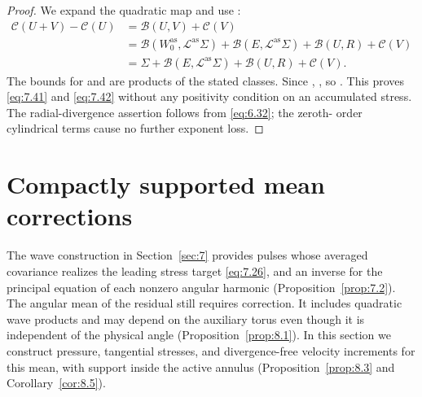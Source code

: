 \begin{proof}
We expand the quadratic map and use
:
\begin{align*}
  \mathcal C(U+V)-\mathcal C(U)
    &=\mathcal B(U,V)+\mathcal C(V)\\
    &=\mathcal B(W_0^{\mathrm{as}},\mathcal L^{\mathrm{as}}\Sigma)
      +\mathcal B(E,\mathcal L^{\mathrm{as}}\Sigma)+\mathcal B(U,R)+\mathcal C(V)\\
    &=\Sigma+\mathcal B(E,\mathcal L^{\mathrm{as}}\Sigma)
      +\mathcal B(U,R)+\mathcal C(V).
\end{align*}
The bounds for  and
 are products of the stated classes. Since
,
, so
. This proves \eqref{eq:7.41} and \eqref{eq:7.42} without any positivity condition
%
on an accumulated stress. The radial-divergence assertion follows from \eqref{eq:6.32}; the zeroth-
order cylindrical terms cause no further exponent loss.
\end{proof}

\section{Compactly supported mean corrections}\label{sec:8}
The wave construction in Section~\ref{sec:7} provides pulses whose averaged covariance realizes the
leading stress target \eqref{eq:7.26}, and an inverse for the principal equation of each nonzero angular
harmonic (Proposition~\ref{prop:7.2}). The angular mean of the residual still requires correction. It
includes quadratic wave products and may depend on the auxiliary torus even though it is
independent of the physical angle (Proposition~\ref{prop:8.1}). In this section we construct pressure,
tangential stresses, and divergence-free velocity increments for this mean, with support
inside the active annulus (Proposition~\ref{prop:8.3} and Corollary~\ref{cor:8.5}).


